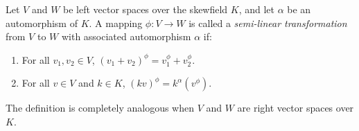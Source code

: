 Let $V$ and $W$ be left vector spaces over the skewfield $K$, and let $\alpha$ be an automorphism of $K$. A mapping $\phi: V \to W$ is called a \textit{semi-linear transformation} from $V$ to $W$ with associated automorphism $\alpha$ if:

\begin{enumerate}
\item[(i)] For all $v_1, v_2 \in V$, $(v_1 + v_2)^\phi = v_1^\phi + v_2^\phi$.
\item[(ii)] For all $v \in V$ and $k \in K$, $(kv)^\phi = k^\alpha (v^\phi)$.
\end{enumerate}

The definition is completely analogous when $V$ and $W$ are right vector spaces over $K$.
